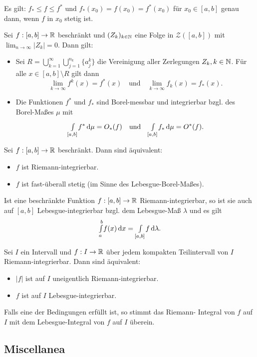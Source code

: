 \documentclass{cheat-sheet}
\theoremstyle{definition}
\begin{document}
\begin{bem}
  Es gilt: $f_* \leq f \leq f^*$ und $f_*(x_0) = f(x_0) = f^*(x_0)$ für $x_0 \in [a, b]$ genau dann, wenn $f$ in $x_0$ stetig ist.
\end{bem}

\begin{satz}
  Sei $f : [a, b] \to \mathbb{R}$ beschränkt und $(Z_k)_{k \in \mathbb{N}}$ eine Folge in $\mathcal{Z}([a, b])$ mit $\lim_{n \to \infty} \left|Z_k\right| = 0$. Dann gilt:
  \begin{itemize}
    \item Sei $R = \bigcup_{k=1}^\infty \bigcup_{j=1}^{n_k} \{ a_j^k \}$ die Vereinigung aller Zerlegungen $Z_k, k \in \mathbb{N}$. Für alle $x \in [a, b] \setminus R$ gilt dann
    \[
      \lim_{k \to \infty} f^k(x) = f^*(x)
      \quad \text{und} \quad
      \lim_{k \to \infty} f_k(x) = f_*(x).
    \]
    \item Die Funktionen $f^*$ und $f_*$ sind Borel-messbar und integrierbar bzgl. des Borel-Maßes $\mu$ mit
    \[ {\textstyle \int\limits_{[a, b]}^{}} f^* \,\mathrm{d} \mu = O_*(f) \quad \text{und} \quad {\textstyle \int\limits_{[a, b]}^{}} f_* \,\mathrm{d} \mu = O^*(f). \]
  \end{itemize}
\end{satz}

\begin{satz}
  Sei $f : [a, b] \to \mathbb{R}$ beschränkt. Dann sind äquivalent:
  \begin{itemize}
    \item $f$ ist Riemann-integrierbar.
    \item $f$ ist fast-überall stetig (im Sinne des Lebesgue-Borel-Maßes).
  \end{itemize}
\end{satz}

\begin{satz}
  Ist eine beschränkte Funktion $f : [a, b] \to \mathbb{R}$ Riemann-integrierbar, so ist sie auch auf $[a, b]$ Lebesgue-integrierbar bzgl. dem Lebesgue-Maß $\lambda$ und es gilt
  \[ {\textstyle \int\limits_{a}^{b}} f(x) \,\mathrm{d} x = {\textstyle \int\limits_{[a, b]}^{}} f \,\mathrm{d} \lambda. \]
\end{satz}

\begin{samepage}
\begin{satz}
  Sei $I$ ein Intervall und $f : I \to \mathbb{R}$ über jedem kompakten Teilintervall von $I$ Riemann-integrierbar. Dann sind äquivalent:
  \begin{itemize}
    \item $\left|f\right|$ ist auf $I$ uneigentlich Riemann-integrierbar.
    \item $f$ ist auf $I$ Lebesgue-integrierbar.
  \end{itemize}
  Falls eine der Bedingungen erfüllt ist, so stimmt das Riemann- Integral von $f$ auf $I$ mit dem Lebesgue-Integral von $f$ auf $I$ überein.
\end{satz}


\subsection{Miscellanea}
\end{samepage}
\end{document}
